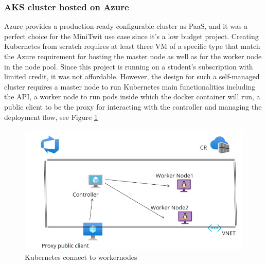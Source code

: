 \subsubsection{AKS cluster hosted on Azure}
Azure provides a production-ready configurable cluster as PaaS, and it was a perfect choice for the MiniTwit use case since it's a low budget project. Creating Kubernetes from scratch requires at least three VM of a specific type that match the Azure requirement for hosting the master node as well as for the worker node in the node pool. Since this project is running on a student’s subscription with limited credit, it was not affordable. However, the design for such a self-managed cluster requires a master node to run Kubernetes main functionalities including the API, a worker node to run pods inside which the docker container will run, a public client to be the proxy for interacting with the controller and managing the deployment flow, see Figure \ref{fig:k8sdiagram} %
\begin{figure}[H]
    \centering
    \includegraphics[width = .7\textwidth]{images/k8sdiagram.png}
    \caption{Kubernetes connect to workernodes}        \label{fig:k8sdiagram}
\end{figure}

